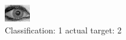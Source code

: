 \begin{figure}[h!]
\begin{center}
\includegraphics[width=0.60\columnwidth]{figures/ID1982_class_1_target_2.png}
\end{center}
\caption{ Classification: 1 actual target: 2}
\label{fig:ID1982_class_1_target_2}
\end{figure}

